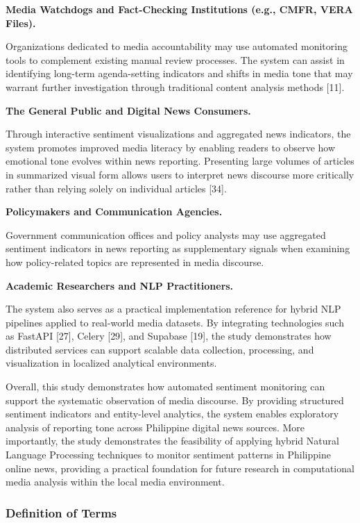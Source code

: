 \textbf{Media Watchdogs and Fact-Checking Institutions (e.g., CMFR, VERA Files).}

Organizations dedicated to media accountability may use automated monitoring tools to complement existing manual review processes. The system can assist in identifying long-term agenda-setting indicators and shifts in media tone that may warrant further investigation through traditional content analysis methods {[}11{]}.

\textbf{The General Public and Digital News Consumers.}

Through interactive sentiment visualizations and aggregated news indicators, the system promotes improved media literacy by enabling readers to observe how emotional tone evolves within news reporting. Presenting large volumes of articles in summarized visual form allows users to interpret news discourse more critically rather than relying solely on individual articles {[}34{]}.

\textbf{Policymakers and Communication Agencies.}

Government communication offices and policy analysts may use aggregated sentiment indicators in news reporting as supplementary signals when examining how policy-related topics are represented in media discourse.

\textbf{Academic Researchers and NLP Practitioners.}

The system also serves as a practical implementation reference for hybrid NLP pipelines applied to real-world media datasets. By integrating technologies such as FastAPI {[}27{]}, Celery {[}29{]}, and Supabase {[}19{]}, the study demonstrates how distributed services can support scalable data collection, processing, and visualization in localized analytical environments.

Overall, this study demonstrates how automated sentiment monitoring can support the systematic observation of media discourse. By providing structured sentiment indicators and entity-level analytics, the system enables exploratory analysis of reporting tone across Philippine digital news sources. More importantly, the study demonstrates the feasibility of applying hybrid Natural Language Processing techniques to monitor sentiment patterns in Philippine online news, providing a practical foundation for future research in computational media analysis within the local media environment.

\subsubsection{\texorpdfstring{\textbf{Definition of Terms}}{Definition of Terms}}\label{definition-of-terms}

